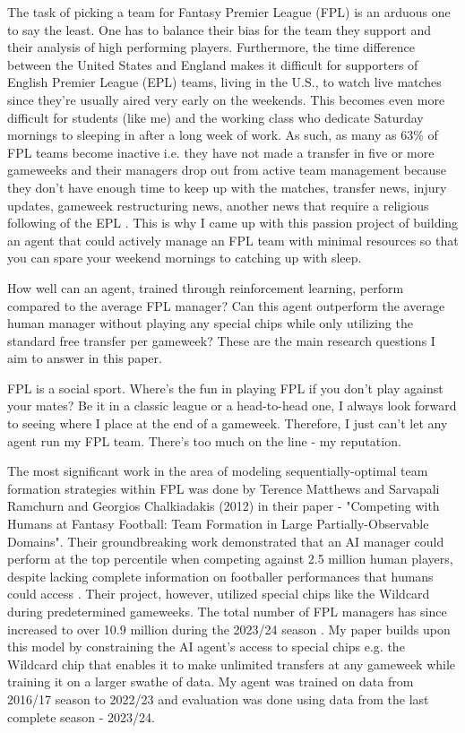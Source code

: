 The task of picking a team for Fantasy Premier League (FPL) is an arduous one to say the least. One has to balance their bias for 
the team they support and their analysis of high performing players. Furthermore, the time difference between the United States and England makes 
it difficult for supporters of English Premier League (EPL) teams, living in the U.S., to watch live matches since they're usually aired very early on the weekends. This becomes 
even more difficult for students (like me) and the working class who dedicate Saturday mornings to sleeping in after a long week of work. As such, as many as 63\% of FPL teams become inactive i.e. they have not made a transfer in five or more gameweeks and their managers 
drop out from active team management because they don't have enough time to keep up with the matches, transfer news, injury updates, gameweek restructuring news, another news that require a religious following of the EPL \cite{FPLStatistics2020}. This is why I came up with this passion project of building an agent that could actively manage an FPL team with minimal resources so that you can spare your weekend mornings to catching up with sleep.

How well can an agent, trained through reinforcement learning, perform compared to the average FPL manager? Can this agent outperform the average human manager without playing any special chips while only utilizing the standard free transfer per gameweek? These are the main research questions I aim to answer in this paper. 

FPL is a social sport. Where's the fun in playing FPL if you don't play against your mates? 
Be it in a classic league or a head-to-head one, I always look forward to seeing where I place at the end of a gameweek. Therefore, I just can't let any agent run my FPL team. There's too much on the line - my reputation.

The most significant work in the area of modeling sequentially-optimal team formation strategies within FPL was done by Terence Matthews and Sarvapali Ramchurn and Georgios Chalkiadakis (2012) in their paper - "Competing with Humans at Fantasy Football: Team Formation in Large Partially-Observable Domains". Their groundbreaking work demonstrated that an AI manager could perform at the top percentile when competing against 2.5 million human players, despite lacking complete information on footballer performances that humans could access \cite{matthews2012}. Their project, however, utilized special chips like the Wildcard during predetermined gameweeks. The total number of FPL managers has since increased to over 10.9 million during the 2023/24 season \cite{keogh2023}. My paper builds upon this model by constraining the AI agent's access to special chips e.g. the Wildcard chip that enables it to make unlimited transfers at any gameweek while training it on a larger swathe of data. My agent was trained on data from 2016/17 season to 2022/23 and evaluation was done using data from the last complete season - 2023/24.

